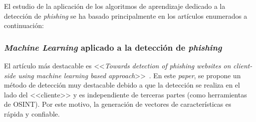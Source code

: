 El estudio de la aplicación de los algoritmos de aprendizaje dedicado a la detección de \textit{phishing} se ha basado principalmente en los artículos enumerados a continuación:

\subsubsection{\textit{Machine Learning} aplicado a la detección de \textit{phishing}}
El artículo más destacable es <<\textit{Towards detection of phishing websites on client-side using machine learning based approach}>>~\cite{featuresPhishing2018Gupta}. En este \textit{paper}, se propone un método de detección muy destacable debido a que la detección se realiza en el lado del <<cliente>> y es independiente de terceras partes (como herramientas de OSINT). Por este motivo, la generación de vectores de características es rápida y confiable.